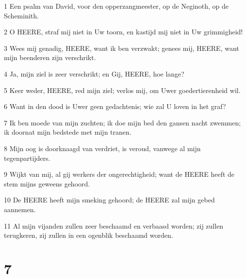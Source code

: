 \par 1 Een psalm van David, voor den opperzangmeester, op de Neginoth, op de Scheminith.
\par 2 O HEERE, straf mij niet in Uw toorn, en kastijd mij niet in Uw grimmigheid!
\par 3 Wees mij genadig, HEERE, want ik ben verzwakt; genees mij, HEERE, want mijn beenderen zijn verschrikt.
\par 4 Ja, mijn ziel is zeer verschrikt; en Gij, HEERE, hoe lange?
\par 5 Keer weder, HEERE, red mijn ziel; verlos mij, om Uwer goedertierenheid wil.
\par 6 Want in den dood is Uwer geen gedachtenis; wie zal U loven in het graf?
\par 7 Ik ben moede van mijn zuchten; ik doe mijn bed den gansen nacht zwemmen; ik doornat mijn bedstede met mijn tranen.
\par 8 Mijn oog is doorknaagd van verdriet, is veroud, vanwege al mijn tegenpartijders.
\par 9 Wijkt van mij, al gij werkers der ongerechtigheid; want de HEERE heeft de stem mijns geweens gehoord.
\par 10 De HEERE heeft mijn smeking gehoord; de HEERE zal mijn gebed aannemen.
\par 11 Al mijn vijanden zullen zeer beschaamd en verbaasd worden; zij zullen terugkeren, zij zullen in een ogenblik beschaamd worden.

\chapter{7}

